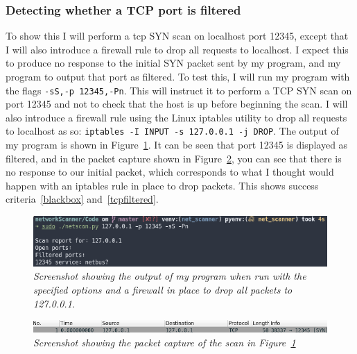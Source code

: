 \documentclass[titlepage]{article}
\let\Oldsubsubsection\subsubsection{}
\renewcommand{\subsubsection}{\FloatBarrier\Oldsubsubsection}
\begin{document}
\subsubsection{Detecting whether a TCP port is filtered}\label{test:tcpfiltered}
To show this I will perform a \gls{tcp} SYN scan on localhost port 12345,
except that I will also introduce a firewall rule to drop all requests to localhost.
I expect this to produce no response to the initial SYN packet sent by my
program, and my program to output that port as filtered. To test this, I will
run my program with the flags \verb|-sS,-p 12345,-Pn|. 
This will instruct it to perform a TCP SYN scan on port 12345 and not to check that the
host is up before beginning the scan.
I will also introduce a firewall rule using the Linux iptables utility to drop
all requests to localhost as so: \verb|iptables -I INPUT -s 127.0.0.1 -j DROP|.
The output of my program is shown in Figure~\ref{tcpfilteredoutput}.
It can be seen that port 12345 is displayed as filtered, and in the packet capture shown in
Figure~\ref{tcpfilteredpcap}, you can see that there is no response to our initial packet,
which corresponds to what I thought would happen with an iptables rule in place
to drop packets. This shows success criteria~\ref{blackbox} and~\ref{tcpfiltered}.

\begin{figure}[H]
  \centering
  \includegraphics[width=\textwidth]{tcpfilteredoutput.png}
  \caption{\textit{%
    Screenshot showing the output of my program when run with the specified options
    and a firewall in place to drop all packets to 127.0.0.1.
}}\label{tcpfilteredoutput}
\end{figure}

\begin{figure}[H]
  \centering
  \includegraphics[width=\textwidth]{tcpfilteredpcap.png}
  \caption{\textit{%
    Screenshot showing the packet capture of the scan in Figure~\ref{tcpfilteredoutput}
}}\label{tcpfilteredpcap}
\end{figure}
\end{document}
